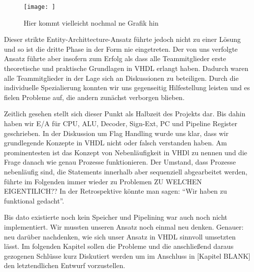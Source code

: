 \documentclass[paper=a4,fontsize=12pt,twocolumn]{scrreprt}
\begin{document}
\begin{figure}
    \centering
    \texttt{[image: ]}
    \caption{Hier kommt vielleicht nochmal ne Grafik hin}
    \label{fig:my_label}
\end{figure}

%
%

Dieser strikte Entity-Archittecture-Ansatz führte jedoch nicht zu einer Lösung und so ist die dritte Phase in der Form nie eingetreten.
Der von uns verfolgte Ansatz führte aber insofern zum Erfolg als dass alle Teammitglieder erste theoretische und praktische Grundlagen in VHDL erlangt haben.
Dadurch waren alle Teammitglieder in der Lage sich an Diskussionen zu beteiligen.
Durch die individuelle Spezialierung konnten wir uns gegenseitig Hilfestellung leisten und es fielen Probleme auf, die andern zunächst verborgen blieben.

Zeitlich gesehen stellt sich dieser Punkt als Halbzeit des Projekts dar.
Bis dahin haben wir E/A für CPU, ALU, Decoder, Sign-Ext, PC und Pipeline Register geschrieben.
In der Diskussion um Flag Handling wurde uns klar, dass wir grundlegende Konzepte in VHDL nicht oder falsch verstanden haben.
Am prominentesten ist das Konzept von Nebenläufigkeit in VHDl zu nennen und die Frage danach wie genau Prozesse funktionieren.
Der Umstand, dass Prozesse nebenläufig sind, die Statements innerhalb aber sequenziell abgearbeitet werden, führte im Folgenden immer wieder zu Problemen {\color{red}ZU WELCHEN EIGENTILICH??}
In der Retrospektive könnte man sagen: \enquote{Wir haben zu funktional gedacht}.





Bis dato existierte noch kein Speicher und Pipelining war auch noch nicht implementiert.
Wir mussten unseren Ansatz noch einmal neu denken. Genauer: neu darüber nachdenken, wie sich unser Ansatz in VHDL sinnvoll umsetzten lässt.
Im folgenden Kapitel sollen die Probleme und die anschließend daraus gezogenen Schlüsse kurz Diskutiert werden um im Anschluss in [Kapitel BLANK] den letztendlichen Entwurf vorzustellen. 
\end{document}
